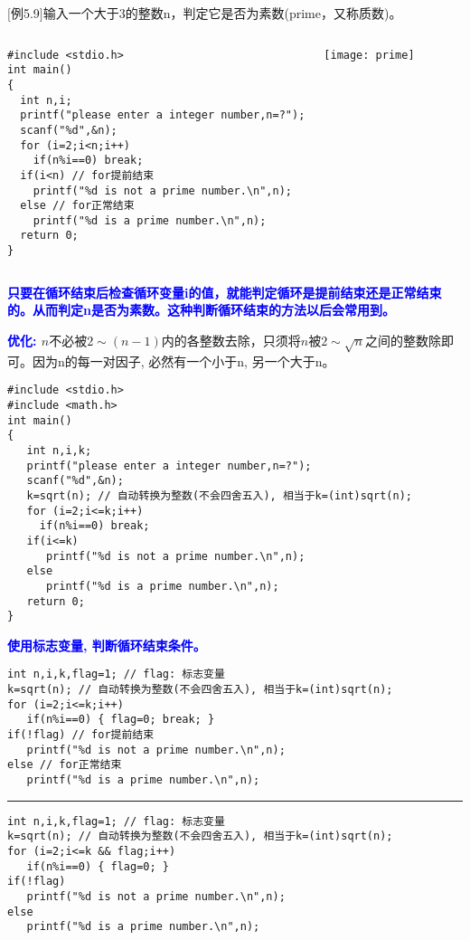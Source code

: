 \begin{frame}
\small
$[$例5.9$]$输入一个大于3的整数n，判定它是否为素数(prime，又称质数)。
\centering
\begin{columns}
\begin{lstlisting}
#include <stdio.h>
int main()
{
  int n,i;
  printf("please enter a integer number,n=?");
  scanf("%d",&n);
  for (i=2;i<n;i++)
    if(n%i==0) break;
  if(i<n) // for提前结束
    printf("%d is not a prime number.\n",n);
  else // for正常结束
    printf("%d is a prime number.\n",n);
  return 0;
}
\end{lstlisting}
	\texttt{[image: prime]}
\end{columns}
\textbf{\textcolor{blue}{只要在循环结束后检查循环变量i的值，就能判定循环是提前结束还是正常结束的。从而判定n是否为素数。这种判断循环结束的方法以后会常用到。}}
\end{frame}

\begin{frame}
\small
\textbf{\textcolor{blue}{优化: }} $n$不必被$2\sim (n-1)$内的各整数去除，只须将$n$被$2\sim\sqrt{n}$之间的整数除即可。因为n的每一对因子, 必然有一个小于n, 另一个大于n。
\begin{lstlisting}
#include <stdio.h>
#include <math.h>
int main()
{
   int n,i,k;
   printf("please enter a integer number,n=?");
   scanf("%d",&n);
   k=sqrt(n); // 自动转换为整数(不会四舍五入), 相当于k=(int)sqrt(n);
   for (i=2;i<=k;i++)
     if(n%i==0) break;
   if(i<=k) 
      printf("%d is not a prime number.\n",n);
   else 
      printf("%d is a prime number.\n",n);
   return 0;
}
\end{lstlisting}
\end{frame}

\begin{frame}
\small
\textbf{\textcolor{blue}{使用标志变量, 判断循环结束条件。}}
\begin{lstlisting}
int n,i,k,flag=1; // flag: 标志变量
k=sqrt(n); // 自动转换为整数(不会四舍五入), 相当于k=(int)sqrt(n);
for (i=2;i<=k;i++)
   if(n%i==0) { flag=0; break; }
if(!flag) // for提前结束
   printf("%d is not a prime number.\n",n);
else // for正常结束
   printf("%d is a prime number.\n",n);
\end{lstlisting}
\pause
\rule{\textwidth}{1pt} %
\begin{lstlisting}
int n,i,k,flag=1; // flag: 标志变量
k=sqrt(n); // 自动转换为整数(不会四舍五入), 相当于k=(int)sqrt(n);
for (i=2;i<=k && flag;i++)
   if(n%i==0) { flag=0; }
if(!flag) 
   printf("%d is not a prime number.\n",n);
else 
   printf("%d is a prime number.\n",n);
\end{lstlisting}
\end{frame}

